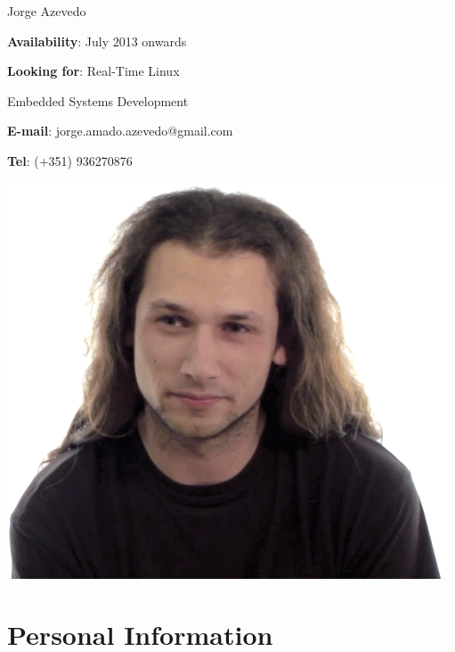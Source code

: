 



\standardHeader
{
	{\Huge Jorge Azevedo}

	\vspace{1.5mm}


	\vspace*{10mm}

	\textbf{Availability}: July 2013 onwards

	\textbf{Looking for}: Real-Time Linux

	\hspace{66pt}Embedded Systems Development

	\textbf{E-mail}: jorge.amado.azevedo@gmail.com

	\textbf{Tel}: \small{(+351) 936270876}
} {
	\includegraphics[width=\textwidth]{img/foto}
}

\section*{Personal Information}




